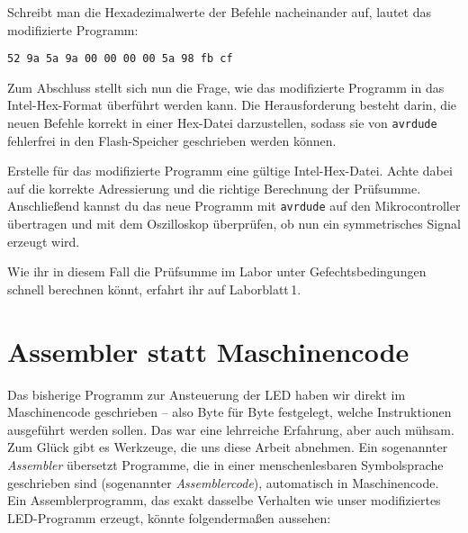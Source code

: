 \documentclass[a4paper,12pt]{article}
\begin{document}
\noindent
Schreibt man die Hexadezimalwerte der Befehle nacheinander auf, lautet das
modifizierte Programm:
\begin{center}
    \texttt{52 9a 5a 9a 00 00 00 00 5a 98 fb cf}
\end{center}

\noindent
Zum Abschluss stellt sich nun die Frage, wie das modifizierte Programm in das
Intel-Hex-Format überführt werden kann. Die Herausforderung besteht darin, die
neuen Befehle korrekt in einer Hex-Datei darzustellen, sodass sie von
\texttt{avrdude} fehlerfrei in den Flash-Speicher geschrieben werden können.

\vspace{1em}
\begin{tcolorbox}[colback=myblue!5!white, colframe=myblue, title=Übung]
    Erstelle für das modifizierte Programm eine gültige Intel-Hex-Datei. Achte
    dabei auf die korrekte Adressierung und die richtige Berechnung der
    Prüfsumme. Anschließend kannst du das neue Programm mit \texttt{avrdude}
    auf den Mikrocontroller übertragen und mit dem Oszilloskop überprüfen, ob
    nun ein symmetrisches Signal erzeugt wird.
\end{tcolorbox}

\medskip

\noindent
Wie ihr in diesem Fall die Prüfsumme im Labor unter Gefechtsbedingungen schnell
berechnen könnt, erfahrt ihr auf Laborblatt 1.


\section{Assembler statt Maschinencode}
\label{sec:led_pin2}

Das bisherige Programm zur Ansteuerung der LED haben wir direkt im
Maschinencode geschrieben – also Byte für Byte festgelegt, welche Instruktionen
ausgeführt werden sollen. Das war eine lehrreiche Erfahrung, aber auch mühsam.
Zum Glück gibt es Werkzeuge, die uns diese Arbeit abnehmen. Ein sogenannter
\emph{Assembler} übersetzt Programme, die in einer menschenlesbaren
Symbolsprache geschrieben sind (sogenannter \emph{Assemblercode}), automatisch
in Maschinencode.  Ein Assemblerprogramm, das exakt dasselbe Verhalten wie
unser modifiziertes LED-Programm erzeugt, könnte folgendermaßen aussehen:
\end{document}
